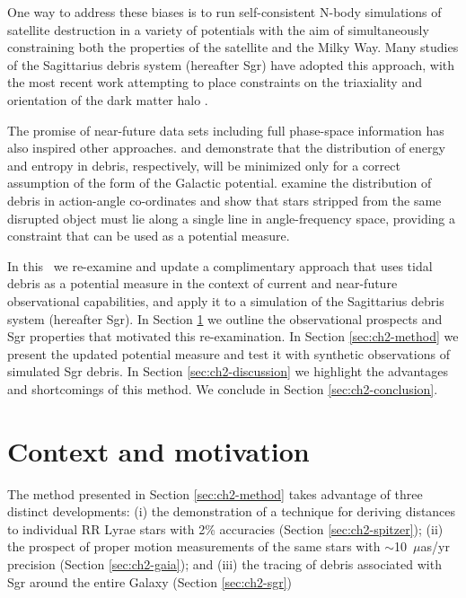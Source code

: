 One way to address these biases is to run self-consistent N-body simulations of
satellite destruction in a variety of potentials with the aim of simultaneously
constraining both the properties of the satellite and the Milky Way. Many
studies of the Sagittarius debris system (hereafter Sgr) have adopted this
approach, with the most recent work attempting to place constraints on the
triaxiality and orientation of the dark matter halo \citep{law10}.

The promise of near-future data sets including full phase-space information has
also inspired other approaches. \citet{binney08} and \citet{penarrubia12}
demonstrate that the distribution of energy and entropy in debris, respectively,
will be minimized only for a correct assumption of the form of the Galactic
potential. \citet{sanders13b} examine the distribution of debris in action-angle
co-ordinates and show that stars stripped from the same disrupted object must
lie along a single line in angle-frequency space, providing a constraint that
can be used as a potential measure.

In this \article\ we re-examine and update a complimentary approach that uses
tidal debris as a potential measure \citep[originally proposed
by][]{johnston99a} in the context of current and near-future observational
capabilities, and apply it to a simulation of the Sagittarius debris system
(hereafter Sgr). In Section \ref{sec:ch2-context} we outline the observational
prospects and Sgr properties that motivated this re-examination. In Section
\ref{sec:ch2-method} we present the updated potential measure and test it with
synthetic observations of simulated Sgr debris. In Section \ref{sec:ch2-discussion}
we highlight the advantages and shortcomings of this method. We conclude in
Section \ref{sec:ch2-conclusion}.

\section{Context and motivation} \label{sec:ch2-context}
The method presented in Section \ref{sec:ch2-method} takes advantage of three
distinct developments: (i) the demonstration of a technique for deriving
distances to individual RR Lyrae stars with 2\% accuracies (Section
\ref{sec:ch2-spitzer}); (ii) the prospect of proper motion measurements of the same
stars with $\sim$10~$\mu$as/yr precision (Section \ref{sec:ch2-gaia}); and (iii)
the tracing of debris associated with Sgr around the entire Galaxy (Section
\ref{sec:ch2-sgr})

